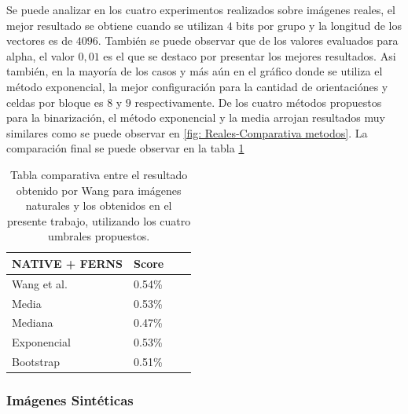 \newpage

		Se puede analizar en los cuatro experimentos realizados sobre imágenes reales, el mejor resultado se obtiene cuando se utilizan $4$ bits por grupo y la longitud de los vectores es de $4096$. También se puede observar que de los valores evaluados para alpha, el valor $0,01$ es el que se destaco por presentar los mejores resultados. Asi también, en la mayoría de los casos y más aún en el gráfico donde se utiliza el método exponencial, la mejor configuración para la cantidad de orientaciónes y celdas por bloque es $8$ y $9$ respectivamente. De los cuatro métodos propuestos para la binarización, el método exponencial y la media arrojan resultados muy similares como se puede observar en \ref{fig: Reales-Comparativa metodos}. La comparación final se puede observar en la tabla \ref{table: reales-comparativa}
	\begin{table}
		\centering
		\begin{tabular}{ | l | l | l | p{5cm} |}
    			\hline
    				\textbf{NATIVE + FERNS} & \textbf{Score} \\ \hline
    				Wang et al. & 0.54\% \\ \hline
    				Media & 0.53\% \\ \hline
    				Mediana & 0.47\%\\ \hline
    				Exponencial & 0.53\% \\ \hline
    				Bootstrap & 0.51\%\\ 
    			\hline
    		\end{tabular}
    		\caption[Resultados imagenes naturales vs Wang]{Tabla comparativa entre el resultado obtenido por Wang para imágenes naturales y los obtenidos en el presente trabajo, utilizando los cuatro umbrales propuestos.}
    		\label{table: reales-comparativa}
    	\end{table}
    	
    	
    	\newpage
    	\subsubsection{Imágenes Sintéticas}
    	
